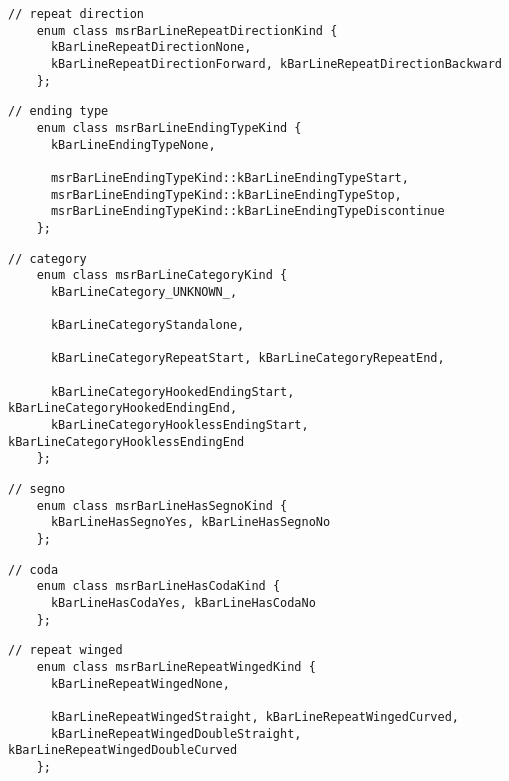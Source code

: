 \begin{lstlisting}[language=CPlusPlus]
    // repeat direction
    enum class msrBarLineRepeatDirectionKind {
      kBarLineRepeatDirectionNone,
      kBarLineRepeatDirectionForward, kBarLineRepeatDirectionBackward
    };
\end{lstlisting}

\begin{lstlisting}[language=CPlusPlus]
    // ending type
    enum class msrBarLineEndingTypeKind {
      kBarLineEndingTypeNone,

      msrBarLineEndingTypeKind::kBarLineEndingTypeStart,
      msrBarLineEndingTypeKind::kBarLineEndingTypeStop,
      msrBarLineEndingTypeKind::kBarLineEndingTypeDiscontinue
    };
\end{lstlisting}

\begin{lstlisting}[language=CPlusPlus]
    // category
    enum class msrBarLineCategoryKind {
      kBarLineCategory_UNKNOWN_,

      kBarLineCategoryStandalone,

      kBarLineCategoryRepeatStart, kBarLineCategoryRepeatEnd,

      kBarLineCategoryHookedEndingStart, kBarLineCategoryHookedEndingEnd,
      kBarLineCategoryHooklessEndingStart, kBarLineCategoryHooklessEndingEnd
    };
\end{lstlisting}

\begin{lstlisting}[language=CPlusPlus]
    // segno
    enum class msrBarLineHasSegnoKind {
      kBarLineHasSegnoYes, kBarLineHasSegnoNo
    };
\end{lstlisting}

\begin{lstlisting}[language=CPlusPlus]
    // coda
    enum class msrBarLineHasCodaKind {
      kBarLineHasCodaYes, kBarLineHasCodaNo
    };

\end{lstlisting}

\begin{lstlisting}[language=CPlusPlus]
    // repeat winged
    enum class msrBarLineRepeatWingedKind {
      kBarLineRepeatWingedNone,

      kBarLineRepeatWingedStraight, kBarLineRepeatWingedCurved,
      kBarLineRepeatWingedDoubleStraight, kBarLineRepeatWingedDoubleCurved
    };
\end{lstlisting}


